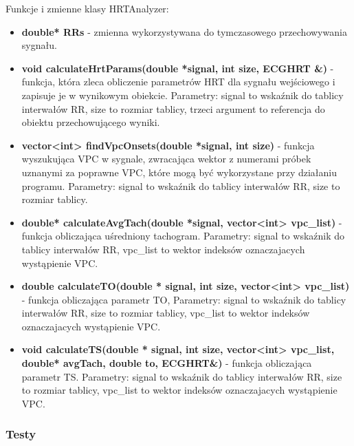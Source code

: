 \documentclass[a4paper, 11pt]{article}
\begin{document}
Funkcje i zmienne klasy HRTAnalyzer:
\begin{itemize}
\item \textbf{double* RRs} - zmienna wykorzystywana do tymczasowego przechowywania sygnału.
\item \textbf{void calculateHrtParams(double *signal, int size, ECGHRT \&)} - funkcja, która zleca obliczenie parametrów HRT dla sygnału wejściowego i zapisuje je w wynikowym obiekcie. Parametry: signal to wskaźnik do tablicy interwałów RR, size to rozmiar tablicy, trzeci argument to referencja do obiektu przechowującego wyniki.
\item \textbf{vector<int> findVpcOnsets(double *signal, int size)} - funkcja wyszukująca VPC w sygnale, zwracająca wektor 
z numerami próbek uznanymi za poprawne VPC, które mogą być wykorzystane przy działaniu programu. Parametry: signal to wskaźnik do tablicy interwałów RR, size to rozmiar tablicy.
\item \textbf{double* calculateAvgTach(double *signal, vector<int> vpc\_list) } - funkcja obliczająca uśredniony tachogram.
Parametry: signal to wskaźnik do tablicy interwałów RR, vpc\_list to wektor indeksów oznaczajacych wystąpienie VPC.
\item \textbf{double calculateTO(double * signal, int size, vector<int> vpc\_list) }  - funkcja obliczająca parametr TO,
Parametry: signal to wskaźnik do tablicy interwałów RR, size to rozmiar tablicy, vpc\_list to wektor indeksów oznaczajacych wystąpienie VPC.
\item \textbf{void calculateTS(double * signal, int size, vector<int> vpc\_list, double* avgTach, double to, ECGHRT\&)} - funkcja obliczająca parametr TS. Parametry: signal to wskaźnik do tablicy interwałów RR, size to rozmiar tablicy, vpc\_list to wektor indeksów oznaczajacych wystąpienie VPC.
\end{itemize}

\subsubsection{Testy}
\label{sec:hrt:tests}
\end{document}
